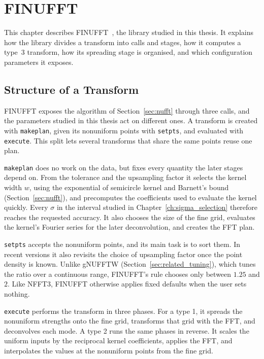 \chapter{FINUFFT}
\label{ch:finufft}

This chapter describes FINUFFT~\cite{barnett2019}, the library studied in this
thesis. It explains how the library divides a transform into calls and stages,
how it computes a type~3 transform, how its spreading stage is organised, and
which configuration parameters it exposes.

\section{Structure of a Transform}
\label{sec:transform_structure}

FINUFFT exposes the algorithm of Section~\ref{sec:nufft} through three calls, and the parameters studied in this thesis act on different ones. A transform is created with \texttt{makeplan}, given its nonuniform points with \texttt{setpts}, and evaluated with \texttt{execute}. This split lets several transforms that share the same points reuse one plan.

\texttt{makeplan} does no work on the data, but fixes every quantity the later stages depend on. From the tolerance and the upsampling factor it selects the kernel width $w$, using the exponential of semicircle kernel and Barnett's bound (Section~\ref{sec:nufft}), and precomputes the coefficients used to evaluate the kernel quickly. Every $\sigma$ in the interval studied in Chapter~\ref{ch:sigma_selection} therefore reaches the requested accuracy. It also chooses the size of the fine grid, evaluates the kernel's Fourier series for the later deconvolution, and creates the FFT plan.

\texttt{setpts} accepts the nonuniform points, and its main task is to sort them. In recent versions it also revisits the choice of upsampling factor once the point density is known. Unlike gNUFFTW (Section~\ref{sec:related_tuning}), which tunes the ratio over a continuous range, FINUFFT's rule chooses only between $1.25$ and $2$. Like NFFT3, FINUFFT otherwise applies fixed defaults when the user sets nothing.

\texttt{execute} performs the transform in three phases. For a type 1, it spreads the nonuniform strengths onto the fine grid, transforms that grid with the FFT, and deconvolves each mode. A type 2 runs the same phases in reverse. It scales the uniform inputs by the reciprocal kernel coefficients, applies the FFT, and interpolates the values at the nonuniform points from the fine grid.

